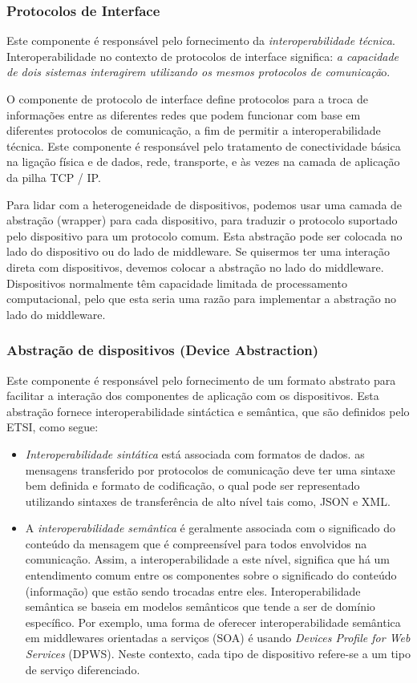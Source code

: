 \subsubsection{Protocolos de Interface}

Este componente é responsável pelo fornecimento da \emph{interoperabilidade
técnica}. Interoperabilidade no contexto de protocolos de interface
significa: \emph{a capacidade de dois sistemas interagirem utilizando
os mesmos protocolos de comunicaçã}o.

O componente de protocolo de interface define protocolos para a troca
de informações entre as diferentes redes que podem funcionar com base
em diferentes protocolos de comunicação, a fim de permitir a interoperabilidade
técnica. Este componente é responsável pelo tratamento de conectividade
básica na ligação física e de dados, rede, transporte, e às vezes
na camada de aplicação da pilha TCP / IP.

Para lidar com a heterogeneidade de dispositivos, podemos usar uma
camada de abstração (wrapper) para cada dispositivo, para traduzir
o protocolo suportado pelo dispositivo para um protocolo comum. Esta
abstração pode ser colocada no lado do dispositivo ou do lado de middleware.
Se quisermos ter uma interação direta com dispositivos, devemos colocar
a abstração no lado do middleware. Dispositivos normalmente têm capacidade
limitada de processamento computacional, pelo que esta seria uma razão
para implementar a abstração no lado do middleware.

\subsubsection{Abstração de dispositivos (Device Abstraction)}

Este componente é responsável pelo fornecimento de um formato abstrato
para facilitar a interação dos componentes de aplicação com os dispositivos.
Esta abstração fornece interoperabilidade sintáctica e semântica,
que são definidos pelo ETSI\cite{ETSI2006}, como segue:
\begin{itemize}
\item \emph{Interoperabilidade sintática} está associada com formatos de
dados. as mensagens transferido por protocolos de comunicação deve
ter uma sintaxe bem definida e formato de codificação, o qual pode
ser representado utilizando sintaxes de transferência de alto nível
tais como, JSON e XML.
\item A \emph{interoperabilidade semântica} é geralmente associada com o
significado do conteúdo da mensagem que é compreensível para todos
envolvidos na comunicação. Assim, a interoperabilidade a este nível,
significa que há um entendimento comum entre os componentes sobre
o significado do conteúdo (informação) que estão sendo trocadas entre
eles. Interoperabilidade semântica se baseia em modelos semânticos
que tende a ser de domínio específico. Por exemplo, uma forma de oferecer
interoperabilidade semântica em middlewares orientadas a serviços
(SOA)\cite{w3c:soa} é usando \emph{Devices Profile for Web Services}
(DPWS)\cite{driscoll2009devices}. Neste contexto, cada tipo de dispositivo
refere-se a um tipo de serviço diferenciado.
\end{itemize}

